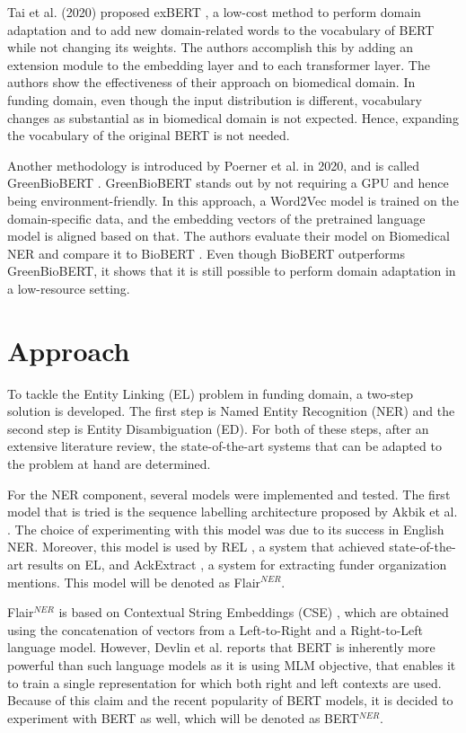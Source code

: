 \documentclass{report}
\theoremstyle{definition}
\theoremstyle{remark}
\begin{document}
Tai et al. (2020) proposed exBERT \cite{exBERT}, a low-cost method to perform domain adaptation and to add new domain-related words to the vocabulary of BERT while not changing its weights. The authors accomplish this by adding an extension module to the embedding layer and to each transformer layer. The authors show the effectiveness of their approach on biomedical domain. In funding domain, even though the input distribution is different, vocabulary changes as substantial as in biomedical domain is not expected. Hence, expanding the vocabulary of the original BERT is not needed. 

Another methodology is introduced by Poerner et al.  in 2020, and is called GreenBioBERT \cite{word2vectoBERT}. GreenBioBERT stands out by not requiring a GPU and hence being environment-friendly. In this approach, a Word2Vec model is trained on the domain-specific data, and the embedding vectors of the pretrained language model is aligned based on that. The authors evaluate their model on Biomedical NER and compare it to BioBERT \cite{biobert}. Even though BioBERT outperforms GreenBioBERT, it shows that it is still possible to perform domain adaptation in a low-resource setting.



\newpage
\chapter{Approach}
\label{chapter:Approach}
To tackle the Entity Linking (EL) problem in funding domain, a two-step solution is developed. The first step is Named Entity Recognition (NER) and the second step is Entity Disambiguation (ED). For both of these steps, after an extensive literature review, the state-of-the-art systems that can be adapted to the problem at hand are determined.

For the NER component, several models were implemented and tested. The first model that is tried is the sequence labelling architecture proposed by Akbik et al. \cite{flairpaper}. The choice of experimenting with this model was due to its success in English NER. Moreover, this model is used by REL \cite{REL}, a system that achieved state-of-the-art results on EL, and AckExtract \cite{AckExtract}, a system for extracting funder organization mentions. This model will be denoted as Flair$^{NER}$.

Flair$^{NER}$ is based on Contextual String Embeddings (CSE) \cite{flairpaper}, which are obtained using the concatenation of vectors from a Left-to-Right and a Right-to-Left language model. However, Devlin et al. \cite{BERT} reports that BERT is inherently more powerful than such language models as it is using MLM objective, that enables it to train a single representation for which both right and left contexts are used. Because of this claim and the recent popularity of BERT models, it is decided to experiment with BERT as well, which will be denoted as BERT$^{NER}$. 
\end{document}
